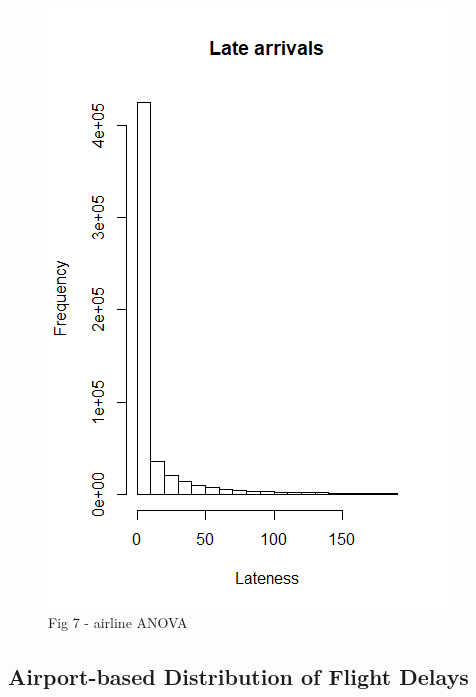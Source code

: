 \documentclass[12pt, a4paper, openany]{book}
\begin{document}
	 		\begin{figure}[h]
	 		\includegraphics[width = 1 \textwidth]{../figures/LateArrivalsHistogram}
	 		\caption{Fig 7 - airline ANOVA}
	 		\end{figure}

		\subsection{Airport-based Distribution of Flight Delays}
			
\end{document}
